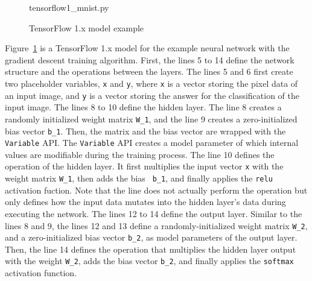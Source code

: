 \begin{figure}[ht!]

{tensorflow1_mnist.py}
  \caption{TensorFlow 1.x model example}
\label{fig:back:tf1}
\end{figure}

Figure~\ref{fig:back:tf1} is a TensorFlow 1.x model for the example neural
network with the gradient descent training algorithm.
First, the lines 5 to 14 define the network structure and the operations
between the layers.
The lines 5 and 6 first create two placeholder variables, {\tt x} and {\tt y},
where {\tt x} is a vector storing the pixel data of an input image, and {\tt y}
is a vector storing the answer for the classification of the input image. 
The lines 8 to 10 define the hidden layer.
The line 8 creates a randomly initialized weight matrix {\tt W\_1}, and the
line 9 creates a zero-initialized bias vector {\tt b\_1}.
Then, the matrix and the bias vector are wrapped with the {\tt Variable} API.
The {\tt Variable} API creates a model parameter of which internal values are
modifiable during the training process.
The line 10 defines the operation of the hidden layer. It first multiplies the
input vector {\tt x} with the weight matrix {\tt W\_1}, then adds the bias {\tt
b\_1}, and finally applies the {\tt relu} activation fuction. 
Note that the line does not actually perform the operation but only defines how
the input data mutates into the hidden layer's data during executing the
network.
The lines 12 to 14 define the output layer.
Similar to the lines 8 and 9, the lines 12 and 13 define a randomly-initialized
weight matrix {\tt W\_2}, and a zero-initialized bias vector {\tt b\_2}, as
model parameters of the output layer.
Then, the line 14 defines the operation that
multiplies the hidden layer output with
the weight {\tt W\_2}, adds the bias vector {\tt b\_2}, and finally applies the
{\tt softmax} activation function.





